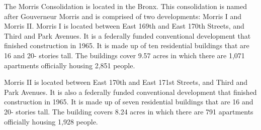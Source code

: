 The Morris Consolidation is located in the Bronx. This consolidation is named after Gouverneur Morris and is comprised of two developments: Morris I and Morris II. Morris I is located between East 169th and East 170th Streets, and Third and Park Avenues. It is a federally funded conventional development that finished construction in 1965. It is made up of ten residential buildings that are 16 and 20- stories tall. The buildings cover 9.57 acres in which there are 1,071 apartments officially housing 2,851 people. \par \vspace{.7\baselineskip}Morris II is located between East 170th and East 171st Streets, and Third and Park Avenues. It is also a federally funded conventional development that finished construction in 1965.  It is made up of seven residential buildings that are 16 and 20- stories tall. The building covers 8.24 acres in which there are 791 apartments officially housing 1,928 people.